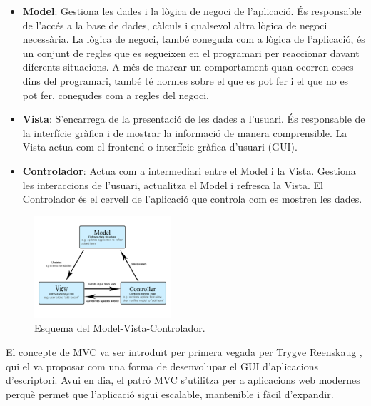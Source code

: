 \documentclass{ieeetj}
\begin{document}
\begin{itemize}
    \item \textbf{Model}: Gestiona les dades i la lògica de negoci de l'aplicació. És responsable de l'accés a la base de dades, càlculs i qualsevol altra lògica de negoci necessària. La lògica de negoci, també coneguda com a lògica de l'aplicació, és un conjunt de regles que es segueixen en el programari per reaccionar davant diferents situacions. A més de marcar un comportament quan ocorren coses dins del programari, també té normes sobre el que es pot fer i el que no es pot fer, conegudes com a regles del negoci.
    \item \textbf{Vista}: S'encarrega de la presentació de les dades a l'usuari. És responsable de la interfície gràfica i de mostrar la informació de manera comprensible. La Vista actua com el frontend o interfície gràfica d'usuari (GUI).
    \item \textbf{Controlador}: Actua com a intermediari entre el Model i la Vista. Gestiona les interaccions de l'usuari, actualitza el Model i refresca la Vista. El Controlador és el cervell de l'aplicació que controla com es mostren les dades.
\end{itemize}

\begin{figure}[htbp]
\centerline{\includegraphics[width=0.45\textwidth]{Cap1Matrius/docs/png/MVC.png}}
\caption{Esquema del Model-Vista-Controlador.}
\label{fig:mvc}
\end{figure}

El concepte de MVC va ser introduït per primera vegada per \href{https://en.wikipedia.org/wiki/Trygve_Reenskaug}{Trygve Reenskaug}
, qui el va proposar com una forma de desenvolupar el GUI d'aplicacions d'escriptori. Avui en dia, el patró MVC s'utilitza per a aplicacions web modernes perquè permet que l'aplicació sigui escalable, mantenible i fàcil d'expandir.
\end{document}
